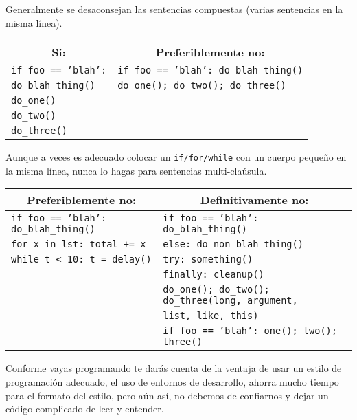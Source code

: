 Generalmente se desaconsejan las sentencias compuestas (varias sentencias en la misma línea).
\begin{center}
\begin{tabular}{| l | l |}
\hline
\multicolumn{1}{|c|}{\textbf{Si:}} & \multicolumn{1}{c|}{\textbf{Preferiblemente no:}} \\ \hline
\texttt{if foo == 'blah':} & \texttt{if foo == 'blah': do\_blah\_thing()} \\
\texttt{\quad do\_blah\_thing()} & \texttt{do\_one(); do\_two(); do\_three()} \\
\texttt{do\_one()} & \\
\texttt{do\_two()} & \\
\texttt{do\_three()} & \\ \hline
\end{tabular}
\end{center}
Aunque a veces es adecuado colocar un \texttt{if/for/while} con un cuerpo pequeño en la misma línea, nunca lo hagas para sentencias multi-claúsula.
\begin{center}
\begin{tabular}{| l | l |}
\hline
\multicolumn{1}{|c|}{\textbf{Preferiblemente no:}} & \multicolumn{1}{c|}{\textbf{Definitivamente no:}} \\ \hline
\texttt{if foo == 'blah': do\_blah\_thing()} & \texttt{if foo == 'blah': do\_blah\_thing()} \\
\texttt{for x in lst: total += x} & \texttt{else: do\_non\_blah\_thing()} \\
\texttt{while t < 10: t = delay()} & \texttt{try: something()} \\
 & \texttt{finally: cleanup()}\\
 & \texttt{do\_one(); do\_two(); do\_three(long, argument,} \\
 & \texttt{\quad \quad \quad \quad \quad \quad list, like, this)} \\
 & \texttt{if foo == 'blah': one(); two(); three()} \\ \hline
\end{tabular}
\end{center}
Conforme vayas programando te darás cuenta de la ventaja de usar un estilo de programación adecuado, el uso de entornos de desarrollo, ahorra mucho tiempo para el formato del estilo, pero aún así, no debemos de confiarnos y dejar un código complicado de leer y entender.
